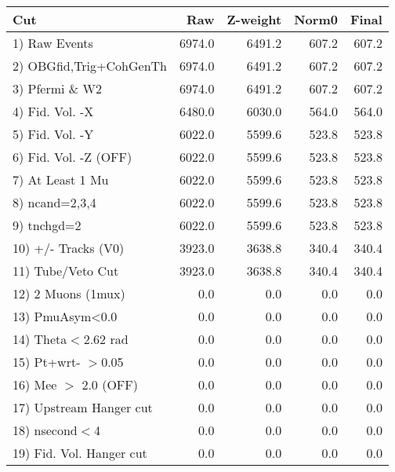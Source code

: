  \begin{table}[h!]\centering
 \begin{tabular}{||l||r|r|r|r||}
 \hline
 \hline
 Cut & Raw & Z-weight & Norm0 & Final \\
 \hline
  1) Raw Events           &      6974.0 &      6491.2 &       607.2 &       607.2 \\
  2) OBGfid,Trig+CohGenTh &      6974.0 &      6491.2 &       607.2 &       607.2 \\
  3) Pfermi \& W2         &      6974.0 &      6491.2 &       607.2 &       607.2 \\
  4) Fid. Vol. -X         &      6480.0 &      6030.0 &       564.0 &       564.0 \\
  5) Fid. Vol. -Y         &      6022.0 &      5599.6 &       523.8 &       523.8 \\
  6) Fid. Vol. -Z (OFF)   &      6022.0 &      5599.6 &       523.8 &       523.8 \\
  7) At Least 1 Mu        &      6022.0 &      5599.6 &       523.8 &       523.8 \\
  8) ncand=2,3,4          &      6022.0 &      5599.6 &       523.8 &       523.8 \\
  9) tnchgd=2             &      6022.0 &      5599.6 &       523.8 &       523.8 \\
 10) +/- Tracks (V0)      &      3923.0 &      3638.8 &       340.4 &       340.4 \\
 11) Tube/Veto Cut        &      3923.0 &      3638.8 &       340.4 &       340.4 \\
 12) 2 Muons (1mux)       &         0.0 &         0.0 &         0.0 &         0.0 \\
 13) PmuAsym<0.0          &         0.0 &         0.0 &         0.0 &         0.0 \\
 14) Theta$<$2.62 rad     &         0.0 &         0.0 &         0.0 &         0.0 \\
 15) Pt+wrt- $>$0.05      &         0.0 &         0.0 &         0.0 &         0.0 \\
 16) Mee $>$ 2.0  (OFF)   &         0.0 &         0.0 &         0.0 &         0.0 \\
 17) Upstream Hanger cut  &         0.0 &         0.0 &         0.0 &         0.0 \\
 18) nsecond$<$4          &         0.0 &         0.0 &         0.0 &         0.0 \\
 19) Fid. Vol. Hanger cut &         0.0 &         0.0 &         0.0 &         0.0 \\

\end{tabular}
\end{table}
